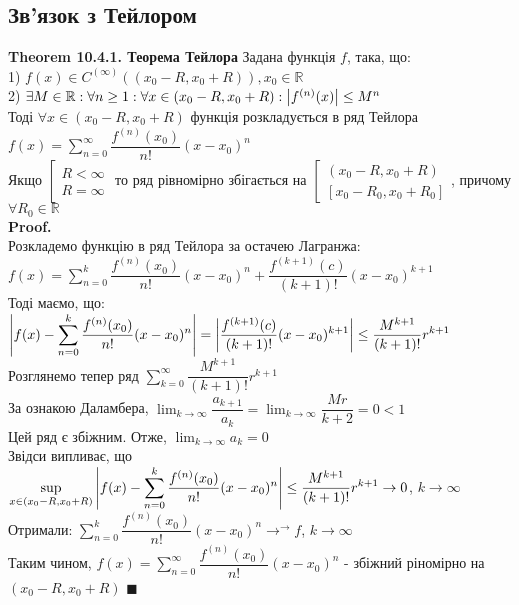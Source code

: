 \documentclass[a4paper, 14pt]{extarticle}
\def\huge{\displaystyle}
\def\th#1{\textbf{Theorem {#1}}}
\def\proof{\textbf{Proof.}\\}
\def\qed{$\blacksquare$}
\begin{document}
\subsection{Зв'язок з Тейлором}
\th{10.4.1. Теорема Тейлора}
Задана функція $f$, така, що:\\
1) $f(x) \in C^{(\infty)}((x_0-R,x_0+R)), x_0 \in \mathbb{R}$\\
2) $\exists M \in \mathbb{R}: \forall n \geq 1: \forall x \in (x_0-R, x_0+R): \abs{f^{(n)}(x)} \leq M^n$\\
Тоді $\forall x \in (x_0-R, x_0+R)$ функція розкладується в ряд Тейлора\\
$f(x) = \huge \sum_{n=0}^\infty \dfrac{f^{(n)}(x_0)}{n!}(x-x_0)^n$\\
Якщо $\left[ \begin{gathered} R < \infty \\ R = \infty \end{gathered} \right.$ то ряд рівномірно збігається на $\left[ \begin{gathered} (x_0-R,x_0+R) \\ [x_0-R_0,x_0+R_0] \end{gathered} \right.$, причому $\forall R_0 \in \mathbb{R}$\\
\proof
Розкладемо функцію в ряд Тейлора за остачею Лагранжа:\\
$f(x) = \huge \sum_{n=0}^k \dfrac{f^{(n)}(x_0)}{n!}(x-x_0)^n + \dfrac{f^{(k+1)}(c)}{(k+1)!}(x-x_0)^{k+1}$\\
Тоді маємо, що:\\
$\huge \abs{f(x) - \sum_{n=0}^k \dfrac{f^{(n)}(x_0)}{n!}(x-x_0)^n} = \abs{\dfrac{f^{(k+1)}(c)}{(k+1)!}(x-x_0)^{k+1}} \leq \dfrac{M^{k+1}}{(k+1)!}r^{k+1}$\\
Розглянемо тепер ряд $\huge \sum_{k=0}^\infty \dfrac{M^{k+1}}{(k+1)!} r^{k+1}$\\
За ознакою Даламбера, $\huge \lim_{k \to \infty} \dfrac{a_{k+1}}{a_k} = \huge \lim_{k \to \infty} \dfrac{Mr}{k+2} = 0 < 1$\\
Цей ряд є збіжним. Отже, $\huge \lim_{k \to \infty} a_k = 0$\\
Звідси випливає, що\\
$\huge \sup_{x \in (x_0-R,x_0+R)} \abs{f(x) - \sum_{n=0}^k \dfrac{f^{(n)}(x_0)}{n!}(x-x_0)^n} \leq \dfrac{M^{k+1}}{(k+1)!}r^{k+1} \to 0$, $k \to \infty$\\
Отримали: $\huge \sum_{n=0}^k \dfrac{f^{(n)}(x_0)}{n!}(x-x_0)^n \rightarrow^\rightarrow f$, $k \to \infty$\\
Таким чином, $f(x) = \huge \sum_{n=0}^\infty \dfrac{f^{(n)}(x_0)}{n!}(x-x_0)^n$ - збіжний ріномірно на \\ $(x_0-R,x_0+R)$ \qed
\end{document}
